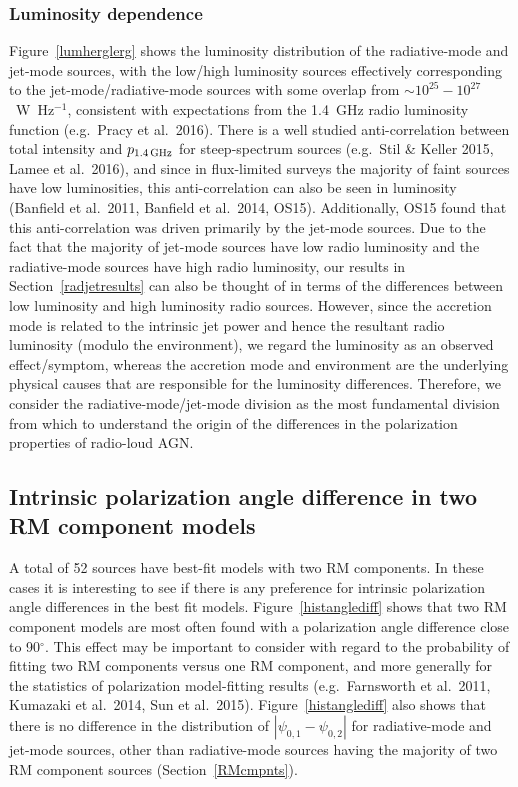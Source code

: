 \documentclass{mnras}
\begin{document}
\subsubsection{Luminosity dependence}
Figure~\ref{lumherglerg} shows the luminosity distribution of the radiative-mode and jet-mode sources, with the low/high luminosity sources effectively corresponding to the jet-mode/radiative-mode sources with some overlap from $\sim10^{25} - 10^{27}$~W~Hz$^{-1}$, consistent with expectations from the 1.4~GHz radio luminosity function (e.g.~Pracy et al.~2016). 
There is a well studied anti-correlation between total intensity and $p_{1.4\, {\rm GHz}}$ for steep-spectrum sources (e.g.~Stil \& Keller 2015, Lamee et al.~2016), and since in flux-limited surveys the majority of faint sources have low luminosities, this anti-correlation can also be seen in luminosity (Banfield et al.~2011, Banfield et al.~2014, OS15). Additionally, OS15 found that this anti-correlation was driven primarily by the jet-mode sources. 
Due to the fact that the majority of jet-mode sources have low radio luminosity and the radiative-mode sources have high radio luminosity, our results in Section~\ref{radjetresults} can also be thought of in terms of the differences between low luminosity and high luminosity radio sources. However, since the accretion mode is related to the intrinsic jet power and hence the resultant radio luminosity (modulo the environment), we regard the luminosity as an observed effect/symptom, whereas the accretion mode and environment are the underlying physical causes that are responsible for the luminosity differences.
Therefore, we consider the radiative-mode/jet-mode division as the most fundamental division from which to understand the origin of the differences in the polarization properties of radio-loud AGN. 


\subsection{Intrinsic polarization angle difference in two RM component models}
A total of 52 sources have best-fit models with two RM components. In these cases it is interesting to see if there is any preference for intrinsic polarization angle differences in the best fit models. Figure~\ref{histanglediff} shows that two RM component models are most often found with a polarization angle difference close to 90$^\circ$. This effect may be important to consider with regard to the probability of fitting two RM components versus one RM component, and more generally for the statistics of polarization model-fitting results (e.g.~Farnsworth et al.~2011, Kumazaki et al.~2014, Sun et al.~2015). 
Figure~\ref{histanglediff} also shows that there is no difference in the distribution of $|\psi_{0,1}-\psi_{0,2}|$ for radiative-mode and jet-mode sources, other than radiative-mode sources having the majority of two RM component sources (Section~\ref{RMcmpnts}). 
\end{document}

